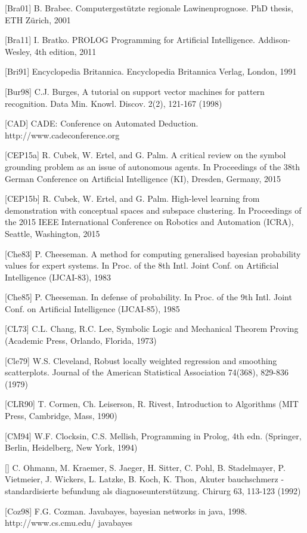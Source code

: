 \documentclass[10pt]{book}
\begin{document}
\begin{center}
[Bra01] B. Brabec. Computergestützte regionale Lawinenprognose. PhD thesis, ETH Zürich, 2001

[Bra11] I. Bratko. PROLOG Programming for Artificial Intelligence. Addison-Wesley, 4th edition, 2011

[Bri91] Encyclopedia Britannica. Encyclopedia Britannica Verlag, London, 1991

[Bur98] C.J. Burges, A tutorial on support vector machines for pattern recognition. Data Min. Knowl. Discov. 2(2), 121-167 (1998)

[CAD] CADE: Conference on Automated Deduction. http://www.cadeconference.org

[CEP15a] R. Cubek, W. Ertel, and G. Palm. A critical review on the symbol grounding problem as an issue of autonomous agents. In Proceedings of the 38th German Conference on Artificial Intelligence (KI), Dresden, Germany, 2015

[CEP15b] R. Cubek, W. Ertel, and G. Palm. High-level learning from demonstration with conceptual spaces and subspace clustering. In Proceedings of the 2015 IEEE International Conference on Robotics and Automation (ICRA), Seattle, Washington, 2015

[Che83] P. Cheeseman. A method for computing generalised bayesian probability values for expert systems. In Proc. of the 8th Intl. Joint Conf. on Artificial Intelligence (IJCAI-83), 1983

[Che85] P. Cheeseman. In defense of probability. In Proc. of the 9th Intl. Joint Conf. on Artificial Intelligence (IJCAI-85), 1985

[CL73] C.L. Chang, R.C. Lee, Symbolic Logic and Mechanical Theorem Proving (Academic Press, Orlando, Florida, 1973)

[Cle79] W.S. Cleveland, Robust locally weighted regression and smoothing scatterplots. Journal of the American Statistical Association 74(368), 829-836 (1979)

[CLR90] T. Cormen, Ch. Leiserson, R. Rivest, Introduction to Algorithms (MIT Press, Cambridge, Mass, 1990)

[CM94] W.F. Clocksin, C.S. Mellish, Programming in Prolog, 4th edn. (Springer, Berlin, Heidelberg, New York, 1994)

[\cite{cms92}] C. Ohmann, M. Kraemer, S. Jaeger, H. Sitter, C. Pohl, B. Stadelmayer, P. Vietmeier, J. Wickers, L. Latzke, B. Koch, K. Thon, Akuter bauchschmerz - standardisierte befundung als diagnoseunterstützung. Chirurg 63, 113-123 (1992)

[Coz98] F.G. Cozman. Javabayes, bayesian networks in java, 1998. http://www.cs.cmu.edu/ javabayes


\end{center}
\end{document}
